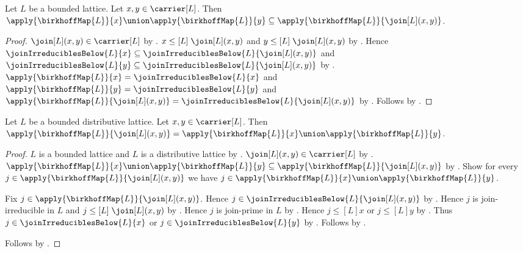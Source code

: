 \begin{proposition}\label{birkhoff_map_join_union_subseteq}
    Let $L$ be a bounded lattice.
    Let $x,y\in\carrier[L]$.
    Then $\apply{\birkhoffMap{L}}{x}\union\apply{\birkhoffMap{L}}{y}
        \subseteq\apply{\birkhoffMap{L}}{\join[L](x,y)}$.
\end{proposition}
\begin{proof}
    $\join[L](x,y)\in\carrier[L]$ by .
    $x\mathrel{\leq[L]}\join[L](x,y)$ and
        $y\mathrel{\leq[L]}\join[L](x,y)$ by .
    Hence $\joinIrreduciblesBelow{L}{x}
            \subseteq\joinIrreduciblesBelow{L}{\join[L](x,y)}$ and
        $\joinIrreduciblesBelow{L}{y}
            \subseteq\joinIrreduciblesBelow{L}{\join[L](x,y)}$ by
        .
    $\apply{\birkhoffMap{L}}{x}=\joinIrreduciblesBelow{L}{x}$ and
        $\apply{\birkhoffMap{L}}{y}=\joinIrreduciblesBelow{L}{y}$ and
        $\apply{\birkhoffMap{L}}{\join[L](x,y)}
            =\joinIrreduciblesBelow{L}{\join[L](x,y)}$ by
        .
    Follows by .
\end{proof}

\begin{theorem}\label{birkhoff_map_join}
    Let $L$ be a bounded distributive lattice.
    Let $x,y\in\carrier[L]$.
    Then $\apply{\birkhoffMap{L}}{\join[L](x,y)}
        =\apply{\birkhoffMap{L}}{x}\union\apply{\birkhoffMap{L}}{y}$.
\end{theorem}
\begin{proof}
    $L$ is a bounded lattice and $L$ is a distributive lattice by
        .
    $\join[L](x,y)\in\carrier[L]$ by .
    $\apply{\birkhoffMap{L}}{x}\union\apply{\birkhoffMap{L}}{y}
        \subseteq\apply{\birkhoffMap{L}}{\join[L](x,y)}$ by
        .
    Show for every $j\in\apply{\birkhoffMap{L}}{\join[L](x,y)}$ we have
        $j\in\apply{\birkhoffMap{L}}{x}\union\apply{\birkhoffMap{L}}{y}$.
    \begin{subproof}
        Fix $j\in\apply{\birkhoffMap{L}}{\join[L](x,y)}$.
        Hence $j\in\joinIrreduciblesBelow{L}{\join[L](x,y)}$ by
            .
        Hence $j$ is join-irreducible in $L$ and
            $j\mathrel{\leq[L]}\join[L](x,y)$ by
            .
        Hence $j$ is join-prime in $L$ by
            .
        Hence $j\mathrel{\leq[L]}x$ or $j\mathrel{\leq[L]}y$ by
            .
        Thus $j\in\joinIrreduciblesBelow{L}{x}$ or
            $j\in\joinIrreduciblesBelow{L}{y}$ by
            .
        Follows by .
    \end{subproof}
    Follows by .
\end{proof}

